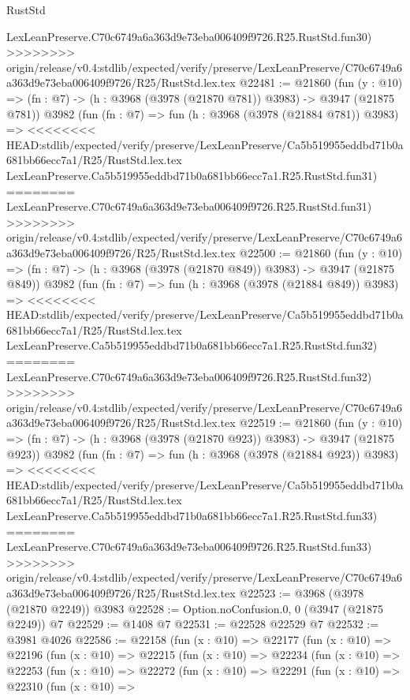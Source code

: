 \begin{lexlean}{RustStd}
\begin{coremodule}
{\begin{coremodule}
{{{{{{{{{{{{{{{{{{{{{{{{{{{{{{{{{{{{{{    LexLeanPreserve.C70c6749a6a363d9e73eba006409f9726.R25.RustStd.fun30)
>>>>>>>> origin/release/v0.4:stdlib/expected/verify/preserve/LexLeanPreserve/C70c6749a6a363d9e73eba006409f9726/R25/RustStd.lex.tex
@22481 := @21860
    (fun (y : @10) => (fn : @7) -> (h : @3968 (@3978 (@21870 @781)) @3983) -> @3947 (@21875 @781))
    @3982
    (fun (fn : @7) =>
    fun (h : @3968 (@3978 (@21884 @781)) @3983) =>
<<<<<<<< HEAD:stdlib/expected/verify/preserve/LexLeanPreserve/Ca5b519955eddbd71b0a681bb66ecc7a1/R25/RustStd.lex.tex
    LexLeanPreserve.Ca5b519955eddbd71b0a681bb66ecc7a1.R25.RustStd.fun31)
========
    LexLeanPreserve.C70c6749a6a363d9e73eba006409f9726.R25.RustStd.fun31)
>>>>>>>> origin/release/v0.4:stdlib/expected/verify/preserve/LexLeanPreserve/C70c6749a6a363d9e73eba006409f9726/R25/RustStd.lex.tex
@22500 := @21860
    (fun (y : @10) => (fn : @7) -> (h : @3968 (@3978 (@21870 @849)) @3983) -> @3947 (@21875 @849))
    @3982
    (fun (fn : @7) =>
    fun (h : @3968 (@3978 (@21884 @849)) @3983) =>
<<<<<<<< HEAD:stdlib/expected/verify/preserve/LexLeanPreserve/Ca5b519955eddbd71b0a681bb66ecc7a1/R25/RustStd.lex.tex
    LexLeanPreserve.Ca5b519955eddbd71b0a681bb66ecc7a1.R25.RustStd.fun32)
========
    LexLeanPreserve.C70c6749a6a363d9e73eba006409f9726.R25.RustStd.fun32)
>>>>>>>> origin/release/v0.4:stdlib/expected/verify/preserve/LexLeanPreserve/C70c6749a6a363d9e73eba006409f9726/R25/RustStd.lex.tex
@22519 := @21860
    (fun (y : @10) => (fn : @7) -> (h : @3968 (@3978 (@21870 @923)) @3983) -> @3947 (@21875 @923))
    @3982
    (fun (fn : @7) =>
    fun (h : @3968 (@3978 (@21884 @923)) @3983) =>
<<<<<<<< HEAD:stdlib/expected/verify/preserve/LexLeanPreserve/Ca5b519955eddbd71b0a681bb66ecc7a1/R25/RustStd.lex.tex
    LexLeanPreserve.Ca5b519955eddbd71b0a681bb66ecc7a1.R25.RustStd.fun33)
========
    LexLeanPreserve.C70c6749a6a363d9e73eba006409f9726.R25.RustStd.fun33)
>>>>>>>> origin/release/v0.4:stdlib/expected/verify/preserve/LexLeanPreserve/C70c6749a6a363d9e73eba006409f9726/R25/RustStd.lex.tex
@22523 := @3968 (@3978 (@21870 @2249)) @3983
@22528 := Option.noConfusion.{0, 0} (@3947 (@21875 @2249)) @7
@22529 := @1408 @7
@22531 := @22528 @22529 @7
@22532 := @3981 @4026
@22586 := @22158
    (fun (x : @10) =>
    @22177
      (fun (x : @10) =>
      @22196
        (fun (x : @10) =>
        @22215
          (fun (x : @10) =>
          @22234
            (fun (x : @10) =>
            @22253
              (fun (x : @10) =>
              @22272
                (fun (x : @10) =>
                @22291
                  (fun (x : @10) =>
                  @22310
                    (fun (x : @10) =>
}}}}}}}}}}}}}}}}}}}}}}}}}}}}}}}}}}}}}}
\end{coremodule}}
\end{coremodule}
\end{lexlean}
